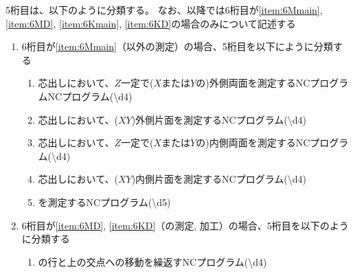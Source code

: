 \clearpage
5桁目は、以下のように分類する。
なお、以降では6桁目が\ref{item:6Mmain}, \ref{item:6MD}, \ref{item:6Kmain}, \ref{item:6KD}の場合のみについて記述する
\begin{enumerate}[label=\alph*)]
\item 6桁目が\ref{item:6Mmain}（\Dimple 以外の測定）の場合、5桁目を以下にように分類する
  \begin{enumerate}[label=\arabic*., ref=\arabic*, start=1]
  \item%
    芯出しにおいて、$Z$一定で($X$または$Y$の)外側両面を測定するNCプログラムNCプログラム({\textbackslash d{4}})
  \item%
    芯出しにおいて、($XY$)外側片面を測定するNCプログラム({\textbackslash d{4}})
  \item%
    芯出しにおいて、$Z$一定で($X$または$Y$の)内側両面を測定するNCプログラム({\textbackslash d{4}})
  \item%
    芯出しにおいて、($XY$)内側片面を測定するNCプログラム({\textbackslash d{4}})
  \item%
    \CenterlineEndFaceDif を測定するNCプログラム({\textbackslash d{5}})
  \end{enumerate}
\item 6桁目が\ref{item:6MD}, \ref{item:6KD}（\Dimple の測定, 加工）の場合、5桁目を以下のように分類する
  \begin{enumerate}[label=\arabic*., ref=\arabic*]
  \item \Dimple の行と\CenterCurvatureLine 上の交点への移動を繰返すNCプログラム({\textbackslash d{4}})

\end{enumerate}
\end{enumerate}
